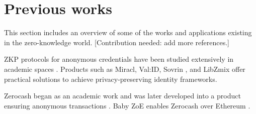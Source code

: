 \section{Previous works}
\label{apps:previous-works}

This section includes an overview of some of the works and applications existing in the zero-knowledge world. 
[Contribution needed: add more references.]


	ZKP protocols for anonymous credentials have been studied extensively in academic spaces 
\cite{2010:SCN:Solving-Revocation-with-Efficient-Update-of-Anonymous-Credentials,
			2014:architecture-for-ABC-technologies,
			2017:ccs:Practical-UC-Secure-Delegatable-Credentials-with-attributes,
			2017:SP:Accumulators-with-Applications-to-Anonymity-Preserving-Revocation,
			2018:NSDI:zkLedger}.  
Products such as Miracl, Val:ID, Sovrin \cite{2018:sovrin}, and LibZmix \cite{2019:github:libzmix} offer practical solutions to achieve privacy-preserving identity frameworks.  

Zerocash began as an academic work and was later developed into a product ensuring anonymous transactions \cite{2014:SP:Zerocash}. 
Baby ZoE enables Zerocash over Ethereum \cite{2018:github:baby-zoe}.

